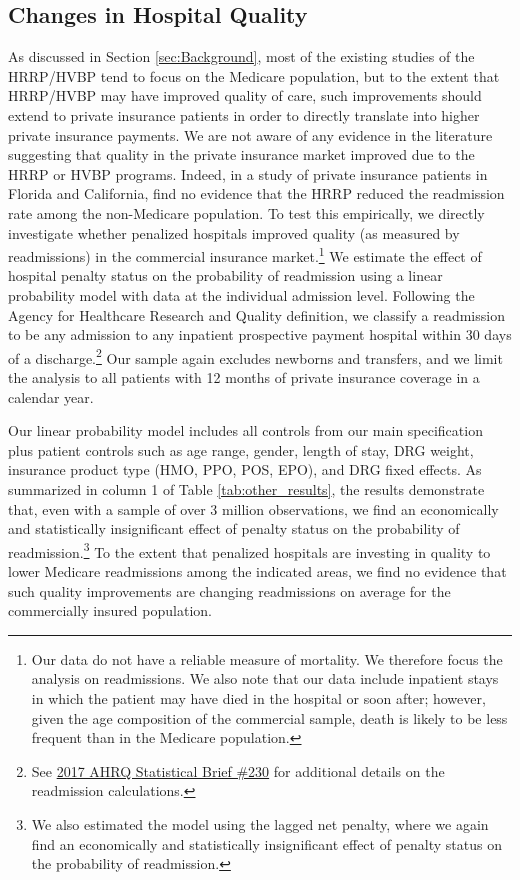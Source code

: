 \documentclass[12pt]{article}
\begin{document}
\subsection{Changes in Hospital Quality}
As discussed in Section \ref{sec:Background}, most of the existing studies of the HRRP/HVBP tend to focus on the Medicare population, but to the extent that HRRP/HVBP may have improved quality of care, such improvements should extend to private insurance patients in order to directly translate into higher private insurance payments. We are not aware of any evidence in the literature suggesting that quality in the private insurance market improved due to the HRRP or HVBP programs. Indeed, in a study of private insurance patients in Florida and California, \cite{demiralp2017} find no evidence that the HRRP reduced the readmission rate among the non-Medicare population. To test this empirically, we directly investigate whether penalized hospitals improved quality (as measured by readmissions) in the commercial insurance market.\footnote{Our data do not have a reliable measure of mortality. We therefore focus the analysis on readmissions. We also note that our data include inpatient stays in which the patient may have died in the hospital or soon after; however, given the age composition of the commercial sample, death is likely to be less frequent than in the Medicare population.} We estimate the effect of hospital penalty status on the probability of readmission using a linear probability model with data at the individual admission level. Following the Agency for Healthcare Research and Quality definition, we classify a readmission to be any admission to any inpatient prospective payment hospital within 30 days of a discharge.\footnote{See \href{https://www.hcup-us.ahrq.gov/reports/statbriefs/sb230-7-Day-Versus-30-Day-Readmissions.jsp?utm_source=ahrq&utm_medium=en1&utm_term=&utm_content=1&utm_campaign=ahrq_en11_7_2017}{2017 AHRQ Statistical Brief \#230} for additional details on the readmission calculations.} Our sample again excludes newborns and transfers, and we limit the analysis to all patients with 12 months of private insurance coverage in a calendar year.

Our linear probability model includes all controls from our main specification plus patient controls such as age range, gender, length of stay, DRG weight, insurance product type (HMO, PPO, POS, EPO), and DRG fixed effects. As summarized in column 1 of Table \ref{tab:other_results}, the results demonstrate that, even with a sample of over 3 million observations, we find an economically and statistically insignificant effect of penalty status on the probability of readmission.\footnote{We also estimated the model using the lagged net penalty, where we again find an economically and statistically insignificant effect of penalty status on the probability of readmission.} To the extent that penalized hospitals are investing in quality to lower Medicare readmissions among the indicated areas, we find no evidence that such quality improvements are changing readmissions on average for the commercially insured population.
\end{document}
